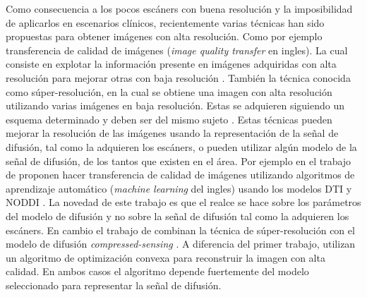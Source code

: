 \documentclass[a4paper,10pt]{article}
\begin{document}
Como consecuencia a los pocos escáners con buena resolución y la imposibilidad de aplicarlos en escenarios 
clínicos, recientemente varias técnicas han sido propuestas para obtener imágenes con alta resolución. Como 
por ejemplo transferencia de calidad de imágenes (\textit{image quality transfer} en ingles). La cual 
consiste en explotar la 
información presente en imágenes adquiridas con alta resolución para mejorar otras con baja resolución 
\citep{Alexander2014}. También la técnica conocida como súper-resolución, en 
la cual se obtiene una imagen con alta resolución utilizando varias imágenes en baja resolución. 
Estas se adquieren siguiendo un esquema determinado y deben ser del mismo sujeto 
\citep{Irani1993,Robinson2010,Ning2016}. Estas técnicas pueden mejorar la resolución de las imágenes usando la 
representación de la señal de difusión, tal como la adquieren los escáners, o pueden utilizar algún modelo de la señal 
de difusión, de los tantos que existen en el área.
Por ejemplo en el trabajo de \citet{Alexander2014} proponen hacer transferencia de 
calidad de imágenes utilizando algoritmos de aprendizaje automático (\textit{machine learning} del ingles) usando los 
modelos DTI y NODDI \citep{Zhang2012}. 
La novedad de este trabajo es que el realce se hace sobre los parámetros del modelo de difusión y no sobre la 
señal de difusión tal como la adquieren los escáners. En cambio el trabajo de \citet{Ning2016} combinan la t\'ecnica 
de súper-resolución con el modelo de difusión \textit{compressed-sensing} \citep{Naidoo2015}. A diferencia del primer 
trabajo, utilizan un algoritmo de optimización convexa para reconstruir la imagen con alta calidad. En ambos casos el 
algoritmo depende fuertemente del modelo seleccionado para representar la señal de difusión.
\end{document}
